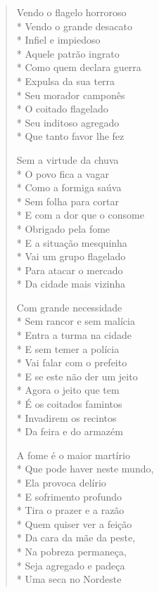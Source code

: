 \begin{verse}
Vendo o flagelo horroroso\\*
Vendo o grande desacato\\*
Infiel e impiedoso\\*
Aquele patrão ingrato\\*
Como quem declara guerra\\*
Expulsa da sua terra\\*
Seu morador camponês\\*
O coitado flagelado\\*
Seu inditoso agregado\\*
Que tanto favor lhe fez

Sem a virtude da chuva\\*
O povo fica a vagar\\*
Como a formiga saúva\\*
Sem folha para cortar\\*
E com a dor que o consome\\*
Obrigado pela fome\\*
E a situação mesquinha\\*
Vai um grupo flagelado\\*
Para atacar o mercado\\*
Da cidade mais vizinha

Com grande necessidade\\*
Sem rancor e sem malícia\\*
Entra a turma na cidade\\*
E sem temer a polícia\\*
Vai falar com o prefeito\\*
E se este não der um jeito\\*
Agora o jeito que tem\\*
É os coitados famintos\\*
Invadirem os recintos\\*
Da feira e do armazém

A fome é o maior martírio\\*
Que pode haver neste mundo,\\*
Ela provoca delírio\\*
E sofrimento profundo\\*
Tira o prazer e a razão\\*
Quem quiser ver a feição\\*
Da cara da mãe da peste,\\*
Na pobreza permaneça,\\*
Seja agregado e padeça\\*
Uma seca no Nordeste


\end{verse}
